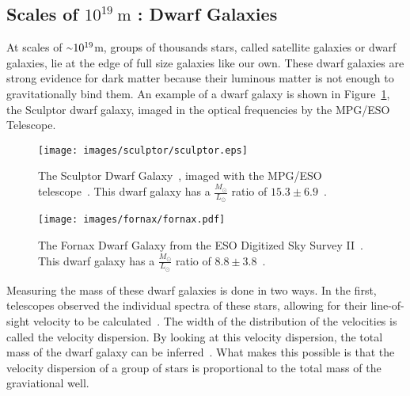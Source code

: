   \subsection{Scales of $10^{19}\:\text{m}$ : Dwarf Galaxies}\label{dm_dwarfscale}
    At scales of $\nicetilde 10^{19}$m, groups of thousands stars, called satellite galaxies or dwarf galaxies, lie at the edge of full size galaxies like our own.
    These dwarf galaxies are strong evidence for dark matter because their luminous matter is not enough to gravitationally bind them.
    An example of a dwarf galaxy is shown in Figure~\ref{fig:sculptor}, the Sculptor dwarf galaxy, imaged in the optical frequencies by the MPG/ESO Telescope.

    \begin{figure}[h]
      \centering
      \texttt{[image: images/sculptor/sculptor.eps]}
      \caption[Sculptor Dwarf Galaxy]{
        The Sculptor Dwarf Galaxy~\cite{sculptor_image}, imaged with the MPG/ESO telescope~\cite{sculptor_paper}.
        This dwarf galaxy has a $\frac{M_\odot}{L_\odot}$ ratio of $15.3\pm6.9$~\cite{sculptor_ml}.
      }
      \label{fig:sculptor}
    \end{figure}
    
    \begin{figure}[h]
      \centering
      \texttt{[image: images/fornax/fornax.pdf]}
      \caption[Fornax Dwarf Galaxy]{
        The Fornax Dwarf Galaxy from the ESO Digitized Sky Survey II~\cite{fornax_image}.
        This dwarf galaxy has a $\frac{M_\odot}{L_\odot}$ ratio of $8.8\pm3.8$~\cite{sculptor_ml}.
      }
      \label{fig:fornax}
    \end{figure}

    Measuring the mass of these dwarf galaxies is done in two ways.
    In the first, telescopes observed the individual spectra of these stars, allowing for their line-of-sight velocity to be calculated~\cite{dwarf_gal_red_giant}.
    The width of the distribution of the velocities is called the velocity dispersion.
    By looking at this velocity dispersion, the total mass of the dwarf galaxy can be inferred~\cite{dwarf_gal_vel_dispersion, dwarf_gal_vel_dispersion2}.
    What makes this possible is that the velocity dispersion of a group of stars is proportional to the total mass of the graviational well.
    

